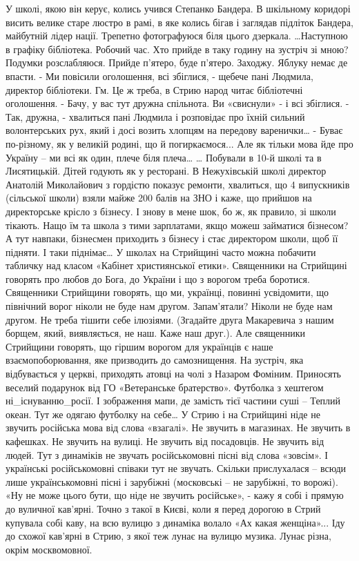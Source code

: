 У школі, якою він керує, колись учився Степанко Бандера. В шкільному коридорі висить велике старе люстро в рамі, в яке колись бігав і заглядав підліток Бандера, майбутній лідер нації. Трепетно фотографуюся біля цього дзеркала. 
…Наступною в графіку бібліотека. Робочий час. Хто прийде в таку годину на зустріч зі мною? Подумки розслабляюся. Прийде п’ятеро, буде п’ятеро. Заходжу. Яблуку немає де впасти. 
- Ми повісили оголошення, всі збіглися, - щебече пані Людмила, директор бібліотеки.
Гм. Це ж треба, в Стрию народ читає бібліотечні оголошення. 
- Бачу, у вас тут дружна спільнота. Ви «свиснули» - і всі збіглися.
- Так, дружна, - хвалиться пані Людмила і розповідає про їхній сильний волонтерських рух, який і досі возить хлопцям на передову варенички… - Буває по-різному, як у великій родині, що й погиркаємося... Але як тільки мова йде про Україну – ми всі як один, плече біля плеча…
… Побували в 10-й школі та в Лисятицькій. Дітей годують як у ресторані. В Нежухівській школі директор Анатолій Миколайович з гордістю показує ремонти, хвалиться, що 4 випускників (сільської школи) взяли майже 200 балів на ЗНО і каже, що прийшов на директорське крісло з бізнесу. І знову в мене шок, бо ж, як правило, зі школи тікають. Нащо їм та школа з тими зарплатами, якщо можеш займатися бізнесом? А тут навпаки, бізнесмен приходить з бізнесу і стає директором школи, щоб її підняти. І таки піднімає… 
У школах на Стрийщині часто можна побачити табличку над класом «Кабінет християнської етики». 
Священники на Стрийщині говорять про любов до Бога, до України і що з ворогом треба боротися. Священники Стрийщини говорять, що ми, українці, повинні усвідомити, що північний ворог ніколи не буде нам другом. Запам’ятали? Ніколи не буде нам другом. Не треба тішити себе ілюзіями. (Згадайте друга Макаревича з нашим борщем, який, виявляється, не наш. Каже наш друг.). Але священники Стрийщини говорять, що гіршим ворогом для українців є наше взаємопоборювання, яке призводить до самознищення.
На зустріч, яка відбувається у церкві, приходять атовці на чолі з Назаром Фоміним. Приносять веселий подарунок від ГО «Ветеранське братерство». Футболка з хештегом ні_існуванню_росії. І зображення мапи, де замість тієї частини суші – Теплий океан. Тут же одягаю футболку на себе… 
У Стрию і на Стрийщині ніде не звучить російська мова від слова «взагалі». Не звучить в магазинах. Не звучить в кафешках. Не звучить на вулиці. Не звучить від посадовців. Не звучить від людей. Тут з динаміків не звучать російськомовні пісні від слова «зовсім». І українські російськомовні співаки тут не звучать. Скільки прислухалася – всюди лише українськомовні пісні і зарубіжні (московські – не зарубіжні, то ворожі). «Ну не може цього бути, що ніде не звучить російське», - кажу я собі і прямую до вуличної кав’ярні. Точно з такої в Києві, коли я перед дорогою в Стрий купувала собі каву, на всю вулицю з динаміка волало «Ах какая женщіна»... Іду до схожої кав’ярні в Стрию, з якої теж лунає на вулицю музика. Лунає різна, окрім москвомовної. 
